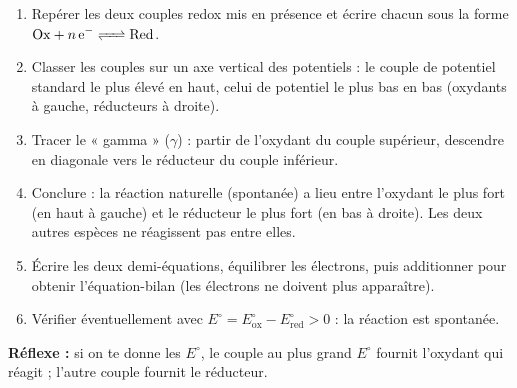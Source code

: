 \documentclass[11pt]{article}
\newcommand{\cle}[1]{{\popxbold\color{popdark}#1}}
\begin{document}
\begin{methode}
\begin{enumerate}
\item Repérer les deux couples redox mis en présence et écrire chacun sous la forme $\ce{Ox + n e- <=> Red}$.
\item Classer les couples sur un axe vertical des potentiels : le couple de \cle{potentiel standard le plus élevé} en haut, celui de potentiel le plus bas en bas (oxydants à gauche, réducteurs à droite).
\item Tracer le « gamma » ($\gamma$) : partir de l'oxydant du couple supérieur, descendre en diagonale vers le réducteur du couple inférieur.
\item Conclure : la réaction \cle{naturelle} (spontanée) a lieu entre l'oxydant le plus fort (en haut à gauche) et le réducteur le plus fort (en bas à droite). Les deux autres espèces ne réagissent pas entre elles.
\item Écrire les deux demi-équations, équilibrer les électrons, puis additionner pour obtenir l'équation-bilan (les électrons ne doivent plus apparaître).
\item Vérifier éventuellement avec $E^{\circ} = E^{\circ}_{\text{ox}} - E^{\circ}_{\text{red}} > 0$ : la réaction est spontanée.
\end{enumerate}
\textbf{Réflexe :} si on te donne les $E^{\circ}$, le couple au plus grand $E^{\circ}$ fournit l'\cle{oxydant} qui réagit ; l'autre couple fournit le réducteur.
\end{methode}
\end{document}
